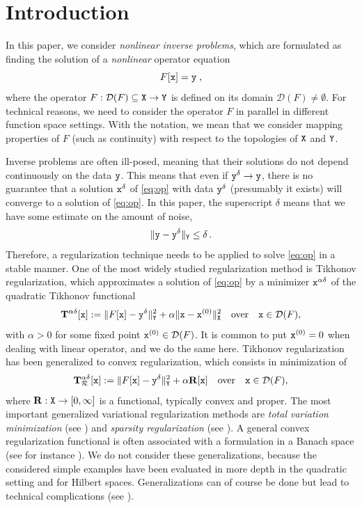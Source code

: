 \documentclass[10pt]{article}
\numberwithin{equation}{section}
\theoremstyle{nonumberplain}
\newcommand{\norms}[1]{\|#1\|}
\newcommand{\X}{{\tt X}}
\newcommand{\Y}{{\tt Y}}
\newcommand{\y}{{\tt y}}
\newcommand{\yd}{\y^\delta}
\newcommand{\x}{{\tt x}}
\newcommand{\Tik}{\mathbf{T}}
\newcommand{\Reg}{\mathbf{R}}
\begin{document}
\section{Introduction}
In this paper, we consider \emph{nonlinear inverse problems}, which are formulated as finding the solution of a \emph{nonlinear} operator equation
\begin{equation} \label{eq:op}
	F[\x]=\y\;,
\end{equation}
where the operator $F: \mathcal{D}(F) \subseteq \X \to \Y$ is defined on its domain $\mathcal{D}(F) \neq \emptyset$. For technical reasons, we need to 
	consider the operator $F$ in parallel in different function space settings. With the notation, we mean that we consider mapping properties of $F$ (such as continuity) with respect to the topologies of $\X$ and $\Y$.

Inverse problems are often ill-posed, meaning that their solutions do not depend continuously on the data $\y$. This means that even if $\y^\delta \to \y$, there is no guarantee that a solution $\x^\delta$ of \autoref{eq:op} with data $\y^\delta$ (presumably it exists) will converge to a solution of \autoref{eq:op}. In this paper, the superscript $\delta$ means that we have some estimate on the amount of noise,
\begin{equation}\label{eq:magnitude}
	\norms{\y-\yd}_\Y \leq \delta\,.
\end{equation}
Therefore, a regularization technique needs to be applied to solve \autoref{eq:op} in a stable manner. One of the most widely studied regularization method is Tikhonov regularization, which approximates a solution of \autoref{eq:op} by a minimizer $\x^{\alpha\delta}$ of the quadratic Tikhonov functional 
\begin{equation} \label{eq:tik}
\Tik^{\alpha\delta}[\x]:=\norms{F[\x]-\yd}_\Y^2 + \alpha \norms{\x-\x^{(0)}}_\X^2 \quad \text{over} \quad  \x \in \mathcal{D}(F), 
\end{equation}
with $\alpha > 0$ for some fixed point $\x^{(0)} \in \mathcal{D}(F)$. It is common to put $\x^{(0)} = 0$ when dealing with linear operator, and we do the same here. Tikhonov regularization has been generalized to convex regularization, which consists in minimization of 
\begin{equation} \label{eq:tikc}
	\Tik_\mathcal{R}^{\alpha\delta}[\x]:=\norms{F[\x]-\yd}_\Y^2 + \alpha \Reg[\x] \quad \text{over} \quad  \x \in \mathcal{D}(F), 
\end{equation}
where $\Reg: \X \to [0,\infty]$ is a functional, typically convex and proper. The most important generalized variational regularization methods are \emph{total variation minimization} (see \cite{RudOshFat92}) and \emph{sparsity regularization} (see \cite{DauDefMol04}). A general convex regularization functional is often associated with a formulation in a Banach space (see for instance \cite{SchGraGroHalLen09,SchuKalHofKaz12}). We do not consider these generalizations, because the considered simple examples have been evaluated in more depth in the quadratic setting and for Hilbert spaces. Generalizations can of course be done but lead to technical complications (see \cite{PoeResSch10}).  
\end{document}
